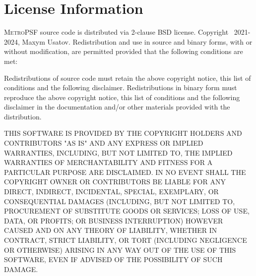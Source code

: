 \documentclass{article}
\begin{document}
\section{License Information}
\textsc{MetroPSF} source code is distributed via 2-clause BSD license. Copyright \textcopyright \ 2021-2024, Maxym Usatov. Redistribution and use in source and binary forms, with or without modification, are permitted provided that the following conditions are met:

    Redistributions of source code must retain the above copyright notice, this list of conditions and the following disclaimer.
    Redistributions in binary form must reproduce the above copyright notice, this list of conditions and the following disclaimer in the documentation and/or other materials provided with the distribution.

THIS SOFTWARE IS PROVIDED BY THE COPYRIGHT HOLDERS AND CONTRIBUTORS "AS IS" AND ANY EXPRESS OR IMPLIED WARRANTIES, INCLUDING, BUT NOT LIMITED TO, THE IMPLIED WARRANTIES OF MERCHANTABILITY AND FITNESS FOR A PARTICULAR PURPOSE ARE DISCLAIMED. IN NO EVENT SHALL THE COPYRIGHT OWNER OR CONTRIBUTORS BE LIABLE FOR ANY DIRECT, INDIRECT, INCIDENTAL, SPECIAL, EXEMPLARY, OR CONSEQUENTIAL DAMAGES (INCLUDING, BUT NOT LIMITED TO, PROCUREMENT OF SUBSTITUTE GOODS OR SERVICES; LOSS OF USE, DATA, OR PROFITS; OR BUSINESS INTERRUPTION) HOWEVER CAUSED AND ON ANY THEORY OF LIABILITY, WHETHER IN CONTRACT, STRICT LIABILITY, OR TORT (INCLUDING NEGLIGENCE OR OTHERWISE) ARISING IN ANY WAY OUT OF THE USE OF THIS SOFTWARE, EVEN IF ADVISED OF THE POSSIBILITY OF SUCH DAMAGE.


 
\end{document}
